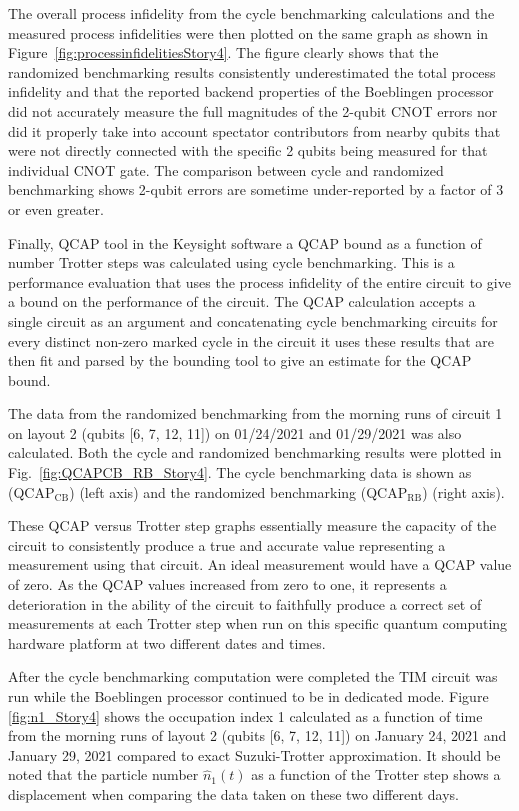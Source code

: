 The overall process infidelity from the cycle benchmarking calculations and the measured process infidelities were then plotted on the same graph as shown in Figure~\ref{fig:processinfidelitiesStory4}.
The figure clearly shows that the randomized benchmarking results consistently underestimated the total process infidelity and that the reported backend properties of the Boeblingen processor did not accurately measure the full magnitudes of the 2-qubit CNOT errors nor did it properly take into account spectator contributors from nearby qubits that were not directly connected with the specific 2 qubits being measured for that individual CNOT gate.  The comparison between cycle and randomized benchmarking shows 2-qubit errors are sometime under-reported  by a factor of 3 or even greater.





Finally, QCAP tool in the Keysight software a QCAP bound as a function of number Trotter steps was calculated using cycle benchmarking.  This is a performance evaluation that uses the process infidelity of the entire circuit to give a bound on the performance of the circuit.  The QCAP calculation accepts a single circuit as an argument and concatenating cycle benchmarking circuits for every distinct non-zero marked cycle in the circuit it uses these results that are then fit and parsed by the bounding tool to give an estimate for the QCAP bound.  

The  data from the randomized benchmarking from the morning runs of circuit 1 on layout 2 (qubits [6, 7, 12, 11]) on 01/24/2021 and 01/29/2021 was also calculated.  Both the cycle and randomized benchmarking results were plotted in Fig.~\ref{fig:QCAPCB_RB_Story4}.  The cycle benchmarking data is shown as (QCAP$_{\text{CB}}$) (left axis) and the randomized benchmarking (QCAP$_{\text{RB}}$) (right axis).  

These QCAP versus Trotter step graphs essentially measure the capacity of the circuit to consistently produce a true and accurate value representing a measurement using that circuit.  An ideal measurement would have a QCAP value of zero.  As the QCAP values increased from zero to one, it represents a deterioration in the ability of the circuit to faithfully produce a correct set of measurements at each Trotter step when run on this specific quantum computing hardware platform at two different dates and times.

After the cycle benchmarking computation were completed the TIM circuit was run while the Boeblingen processor continued to be in dedicated mode.  Figure \ref{fig:n1_Story4} shows the occupation index 1 calculated as a function of time from the morning runs of layout 2 (qubits [6, 7, 12, 11]) on January 24, 2021 and January 29, 2021 compared to exact Suzuki-Trotter approximation.  It should be noted that the particle number $\hat{n}_{1}(t)$ as a function of the Trotter step shows a displacement when comparing the data taken on these two different days.



